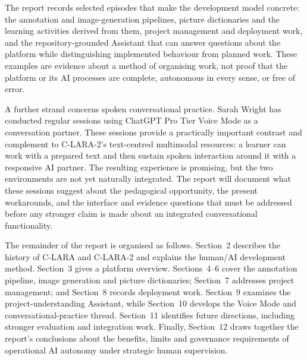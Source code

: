 The report records selected episodes that make the development model
concrete: the annotation and image-generation pipelines, picture
dictionaries and the learning activities derived from them, project
management and deployment work, and the repository-grounded Assistant
that can answer questions about the platform while distinguishing
implemented behaviour from planned work. These examples are evidence
about a method of organising work, not proof that the platform or its AI
processes are complete, autonomous in every sense, or free of error.

A further strand concerns spoken conversational practice. Sarah Wright has
conducted regular sessions using ChatGPT Pro Tier Voice Mode as a conversation
partner. These sessions provide a practically important contrast and
complement to C-LARA-2's text-centred multimodal resources: a learner can
work with a prepared text and then sustain spoken interaction around it with
a responsive AI partner. The resulting experience is promising, but the two
environments are not yet naturally integrated. The report will document what
these sessions suggest about the pedagogical opportunity, the present
workarounds, and the interface and evidence questions that must be addressed
before any stronger claim is made about an integrated conversational
functionality.

The remainder of the report is organised as follows. Section~2 describes the
history of C-LARA and C-LARA-2 and explains the human/AI development method.
Section~3 gives a platform overview. Sections~4--6 cover the annotation
pipeline, image generation and picture dictionaries; Section~7 addresses
project management; and Section~8 records deployment work. Section~9
examines the project-understanding Assistant, while Section~10 develops the
Voice Mode and conversational-practice thread. Section~11 identifies future
directions, including stronger evaluation and integration work. Finally,
Section~12 draws together the report's conclusions about the benefits,
limits and governance requirements of operational AI autonomy under strategic
human supervision.
